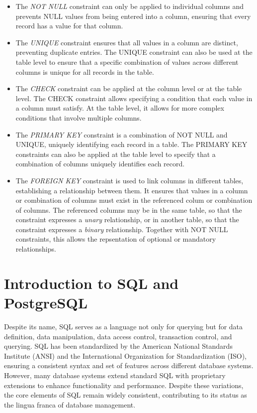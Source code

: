 \begin{itemize}
\item The \emph{NOT NULL} constraint can only be applied to individual columns and prevents NULL values from being entered into a column, ensuring that every record has a value for that column. 
\item The \emph{UNIQUE} constraint ensures that all values in a column are distinct, preventing duplicate entries. The UNIQUE constraint can also be used at the table level to ensure that a specific combination of values across different columns is unique for all records in the table. 
\item The \emph{CHECK} constraint can be applied at the column level or at the table level. The CHECK constraint allows specifying a condition that each value in a column must satisfy. At the table level, it allows for more complex conditions that involve multiple columns. 
\item The \emph{PRIMARY KEY} constraint is a combination of NOT NULL and UNIQUE, uniquely identifying each record in a table. The PRIMARY KEY constraints can also be applied at the table level to specify that a combination of columns uniquely identifies each record. 
\item The \emph{FOREIGN KEY} constraint is used to link columns in different tables, establishing a relationship between them. It ensures that values in a column or combination of columns must exist in the referenced colum or combination of columns. The referenced columns may be in the same table, so that the constraint expresses a \emph{unary} relationship, or in another table, so that the constraint expresses a \emph{binary} relationship. Together with NOT NULL constraints, this allows the repsentation of optional or mandatory relationships. 
\end{itemize}

\section{Introduction to SQL and PostgreSQL}

Despite its name, SQL serves as a language not only for querying but for data definition, data manipulation, data access control, transaction control, and querying. SQL has been standardized by the American National Standards Institute (ANSI) and the International Organization for Standardization (ISO), ensuring a consistent syntax and set of features across different database systems. However, many database systems extend standard SQL with proprietary extensions to enhance functionality and performance. Despite these variations, the core elements of SQL remain widely consistent, contributing to its status as the lingua franca of database management. 

